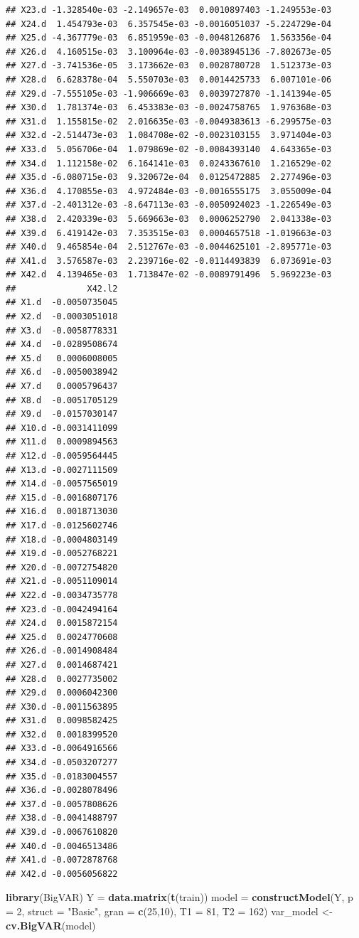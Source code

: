 \documentclass[]{article}
\newenvironment{Shaded}{\begin{snugshade}}{\end{snugshade}}
\newcommand{\DataTypeTok}[1]{\textcolor[rgb]{0.13,0.29,0.53}{#1}}
\newcommand{\DecValTok}[1]{\textcolor[rgb]{0.00,0.00,0.81}{#1}}
\newcommand{\KeywordTok}[1]{\textcolor[rgb]{0.13,0.29,0.53}{\textbf{#1}}}
\newcommand{\NormalTok}[1]{#1}
\newcommand{\StringTok}[1]{\textcolor[rgb]{0.31,0.60,0.02}{#1}}
\begin{document}
\begin{verbatim}
## X23.d -1.328540e-03 -2.149657e-03  0.0010897403 -1.249553e-03
## X24.d  1.454793e-03  6.357545e-03 -0.0016051037 -5.224729e-04
## X25.d -4.367779e-03  6.851959e-03 -0.0048126876  1.563356e-04
## X26.d  4.160515e-03  3.100964e-03 -0.0038945136 -7.802673e-05
## X27.d -3.741536e-05  3.173662e-03  0.0028780728  1.512373e-03
## X28.d  6.628378e-04  5.550703e-03  0.0014425733  6.007101e-06
## X29.d -7.555105e-03 -1.906669e-03  0.0039727870 -1.141394e-05
## X30.d  1.781374e-03  6.453383e-03 -0.0024758765  1.976368e-03
## X31.d  1.155815e-02  2.016635e-03 -0.0049383613 -6.299575e-03
## X32.d -2.514473e-03  1.084708e-02 -0.0023103155  3.971404e-03
## X33.d  5.056706e-04  1.079869e-02 -0.0084393140  4.643365e-03
## X34.d  1.112158e-02  6.164141e-03  0.0243367610  1.216529e-02
## X35.d -6.080715e-03  9.320672e-04  0.0125472885  2.277496e-03
## X36.d  4.170855e-03  4.972484e-03 -0.0016555175  3.055009e-04
## X37.d -2.401312e-03 -8.647113e-03 -0.0050924023 -1.226549e-03
## X38.d  2.420339e-03  5.669663e-03  0.0006252790  2.041338e-03
## X39.d  6.419142e-03  7.353515e-03  0.0004657518 -1.019663e-03
## X40.d  9.465854e-04  2.512767e-03 -0.0044625101 -2.895771e-03
## X41.d  3.576587e-03  2.239716e-02 -0.0114493839  6.073691e-03
## X42.d  4.139465e-03  1.713847e-02 -0.0089791496  5.969223e-03
##              X42.l2
## X1.d  -0.0050735045
## X2.d  -0.0003051018
## X3.d  -0.0058778331
## X4.d  -0.0289508674
## X5.d   0.0006008005
## X6.d  -0.0050038942
## X7.d   0.0005796437
## X8.d  -0.0051705129
## X9.d  -0.0157030147
## X10.d -0.0031411099
## X11.d  0.0009894563
## X12.d -0.0059564445
## X13.d -0.0027111509
## X14.d -0.0057565019
## X15.d -0.0016807176
## X16.d  0.0018713030
## X17.d -0.0125602746
## X18.d -0.0004803149
## X19.d -0.0052768221
## X20.d -0.0072754820
## X21.d -0.0051109014
## X22.d -0.0034735778
## X23.d -0.0042494164
## X24.d  0.0015872154
## X25.d  0.0024770608
## X26.d -0.0014908484
## X27.d  0.0014687421
## X28.d  0.0027735002
## X29.d  0.0006042300
## X30.d -0.0011563895
## X31.d  0.0098582425
## X32.d  0.0018399520
## X33.d -0.0064916566
## X34.d -0.0503207277
## X35.d -0.0183004557
## X36.d -0.0028078496
## X37.d -0.0057808626
## X38.d -0.0041488797
## X39.d -0.0067610820
## X40.d -0.0046513486
## X41.d -0.0072878768
## X42.d -0.0056056822
\end{verbatim}

\begin{Shaded}
\begin{Highlighting}[]
\KeywordTok{library}\NormalTok{(BigVAR)}
\NormalTok{Y =}\StringTok{ }\KeywordTok{data.matrix}\NormalTok{(}\KeywordTok{t}\NormalTok{(train))}
\NormalTok{model =}\StringTok{ }\KeywordTok{constructModel}\NormalTok{(Y, }\DataTypeTok{p =} \DecValTok{2}\NormalTok{, }\DataTypeTok{struct =} \StringTok{"Basic"}\NormalTok{, }\DataTypeTok{gran =} \KeywordTok{c}\NormalTok{(}\DecValTok{25}\NormalTok{,}\DecValTok{10}\NormalTok{), }\DataTypeTok{T1 =} \DecValTok{81}\NormalTok{, }\DataTypeTok{T2 =} \DecValTok{162}\NormalTok{)}
\NormalTok{var_model <-}\StringTok{ }\KeywordTok{cv.BigVAR}\NormalTok{(model)}
\end{Highlighting}
\end{Shaded}
\end{document}
